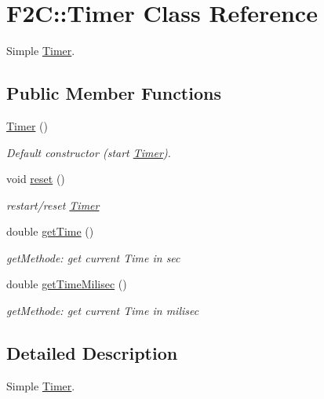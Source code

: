 \hypertarget{class_f2_c_1_1_timer}{
\section{F2C::Timer Class Reference}
\label{class_f2_c_1_1_timer}
}


Simple \hyperlink{class_f2_c_1_1_timer}{Timer}.  


\subsection*{Public Member Functions}
\begin{DoxyCompactItemize}
\item 
\hypertarget{class_f2_c_1_1_timer_a786c1423458090fb43e9b092f46299d0}{
\hyperlink{class_f2_c_1_1_timer_a786c1423458090fb43e9b092f46299d0}{Timer} ()}
\label{class_f2_c_1_1_timer_a786c1423458090fb43e9b092f46299d0}

\begin{DoxyCompactList}\small\item\em Default constructor (start \hyperlink{class_f2_c_1_1_timer}{Timer}). \item\end{DoxyCompactList}\item 
\hypertarget{class_f2_c_1_1_timer_aa756d2bc7532d58e751f6d181f2ca574}{
void \hyperlink{class_f2_c_1_1_timer_aa756d2bc7532d58e751f6d181f2ca574}{reset} ()}
\label{class_f2_c_1_1_timer_aa756d2bc7532d58e751f6d181f2ca574}

\begin{DoxyCompactList}\small\item\em restart/reset \hyperlink{class_f2_c_1_1_timer}{Timer} \item\end{DoxyCompactList}\item 
\hypertarget{class_f2_c_1_1_timer_a35c2a6726226353f19271975763afc90}{
double \hyperlink{class_f2_c_1_1_timer_a35c2a6726226353f19271975763afc90}{getTime} ()}
\label{class_f2_c_1_1_timer_a35c2a6726226353f19271975763afc90}

\begin{DoxyCompactList}\small\item\em getMethode: get current Time in sec \item\end{DoxyCompactList}\item 
\hypertarget{class_f2_c_1_1_timer_a08f7e6802535e40954bb875f612711bd}{
double \hyperlink{class_f2_c_1_1_timer_a08f7e6802535e40954bb875f612711bd}{getTimeMilisec} ()}
\label{class_f2_c_1_1_timer_a08f7e6802535e40954bb875f612711bd}

\begin{DoxyCompactList}\small\item\em getMethode: get current Time in milisec \item\end{DoxyCompactList}\end{DoxyCompactItemize}


\subsection{Detailed Description}
Simple \hyperlink{class_f2_c_1_1_timer}{Timer}. 
